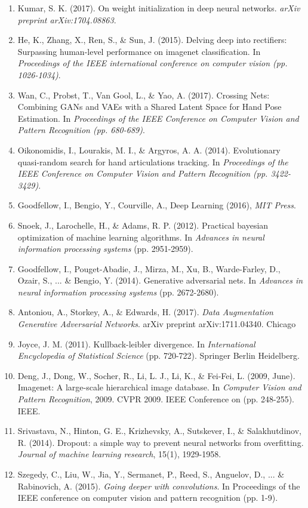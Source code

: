 \documentclass{article}
\begin{document}
\begin{enumerate}
\item Kumar, S. K. (2017). On weight initialization in deep neural networks. \emph{arXiv preprint arXiv:1704.08863}.
\item He, K., Zhang, X., Ren, S., \& Sun, J. (2015). Delving deep into rectifiers: Surpassing human-level performance on imagenet classification. In \emph{Proceedings of the IEEE international conference on computer vision (pp. 1026-1034)}.
\item Wan, C., Probst, T., Van Gool, L., \& Yao, A. (2017). Crossing Nets: Combining GANs and VAEs with a Shared Latent Space for Hand Pose Estimation. In \emph{Proceedings of the IEEE Conference on Computer Vision and Pattern Recognition (pp. 680-689)}.
\item Oikonomidis, I., Lourakis, M. I., \& Argyros, A. A. (2014). Evolutionary quasi-random search for hand articulations tracking. In \emph{Proceedings of the IEEE Conference on Computer Vision and Pattern Recognition (pp. 3422-3429)}.
\item Goodfellow, I., Bengio, Y., Courville, A., Deep Learning (2016), \emph{MIT Press}.
\item Snoek, J., Larochelle, H., \& Adams, R. P. (2012). Practical bayesian optimization of machine learning algorithms. In \emph{Advances in neural information processing systems} (pp. 2951-2959).
\item Goodfellow, I., Pouget-Abadie, J., Mirza, M., Xu, B., Warde-Farley, D., Ozair, S., ... \& Bengio, Y. (2014). Generative adversarial nets. In \emph{Advances in neural information processing systems} (pp. 2672-2680).
\item Antoniou, A., Storkey, A., \& Edwards, H. (2017). \emph{Data Augmentation Generative Adversarial Networks}. arXiv preprint arXiv:1711.04340.
Chicago	
\item Joyce, J. M. (2011). Kullback-leibler divergence. In \emph{International Encyclopedia of Statistical Science} (pp. 720-722). Springer Berlin Heidelberg.
\item Deng, J., Dong, W., Socher, R., Li, L. J., Li, K., \& Fei-Fei, L. (2009, June). Imagenet: A large-scale hierarchical image database. In \emph{Computer Vision and Pattern Recognition}, 2009. CVPR 2009. IEEE Conference on (pp. 248-255). IEEE.
\item Srivastava, N., Hinton, G. E., Krizhevsky, A., Sutskever, I., \& Salakhutdinov, R. (2014). Dropout: a simple way to prevent neural networks from overfitting. \emph{Journal of machine learning research}, 15(1), 1929-1958.
\item Szegedy, C., Liu, W., Jia, Y., Sermanet, P., Reed, S., Anguelov, D., ... \& Rabinovich, A. (2015). \emph{Going deeper with convolutions}. In Proceedings of the IEEE conference on computer vision and pattern recognition (pp. 1-9).

\end{enumerate}
\end{document}
